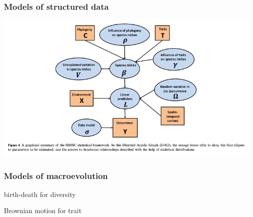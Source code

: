 \documentclass{beamer}
\begin{document}
\begin{frame}
  \frametitle{Models of structured data}

  \includegraphics[width = \textwidth,height = 0.8\textheight,keepaspectratio = true]{figure/ovaskainen_dag}

  \footnotesize{}
\end{frame}


\begin{frame}
  \frametitle{Models of macroevolution}

  birth-death for diversity

  Brownian motion for trait
\end{frame}
\end{document}
